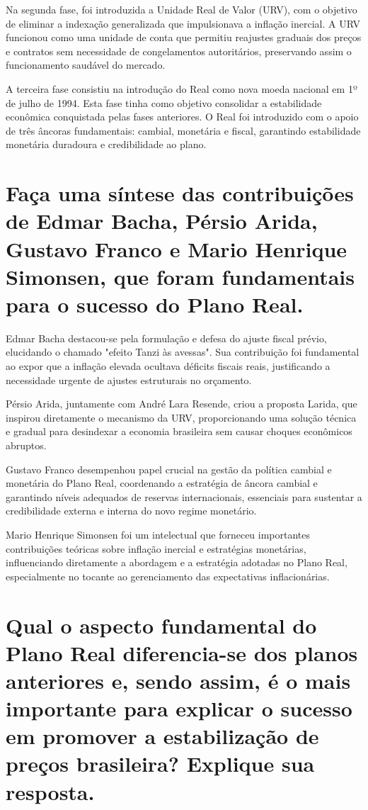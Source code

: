 \documentclass{sciposter}
\begin{document}
\begin{multicols}{3}
Na segunda fase, foi introduzida a Unidade Real de Valor (URV), com o objetivo de eliminar a indexação generalizada que impulsionava a inflação inercial. A URV funcionou como uma unidade de conta que permitiu reajustes graduais dos preços e contratos sem necessidade de congelamentos autoritários, preservando assim o funcionamento saudável do mercado.

A terceira fase consistiu na introdução do Real como nova moeda nacional em 1º de julho de 1994. Esta fase tinha como objetivo consolidar a estabilidade econômica conquistada pelas fases anteriores. O Real foi introduzido com o apoio de três âncoras fundamentais: cambial, monetária e fiscal, garantindo estabilidade monetária duradoura e credibilidade ao plano.

\section{\textbf{Faça uma síntese das contribuições de Edmar Bacha, Pérsio Arida, Gustavo Franco e Mario Henrique Simonsen, que foram fundamentais para o sucesso do Plano Real.}}

Edmar Bacha destacou-se pela formulação e defesa do ajuste fiscal prévio, elucidando o chamado "efeito Tanzi às avessas". Sua contribuição foi fundamental ao expor que a inflação elevada ocultava déficits fiscais reais, justificando a necessidade urgente de ajustes estruturais no orçamento.

Pérsio Arida, juntamente com André Lara Resende, criou a proposta Larida, que inspirou diretamente o mecanismo da URV, proporcionando uma solução técnica e gradual para desindexar a economia brasileira sem causar choques econômicos abruptos.

Gustavo Franco desempenhou papel crucial na gestão da política cambial e monetária do Plano Real, coordenando a estratégia de âncora cambial e garantindo níveis adequados de reservas internacionais, essenciais para sustentar a credibilidade externa e interna do novo regime monetário.

Mario Henrique Simonsen foi um intelectual que forneceu importantes contribuições teóricas sobre inflação inercial e estratégias monetárias, influenciando diretamente a abordagem e a estratégia adotadas no Plano Real, especialmente no tocante ao gerenciamento das expectativas inflacionárias.

\section{\textbf{Qual o aspecto fundamental do Plano Real diferencia-se dos planos anteriores e, sendo assim, é o mais importante para explicar o sucesso em promover a estabilização de preços brasileira? Explique sua resposta.}}


\end{multicols}
\end{document}
